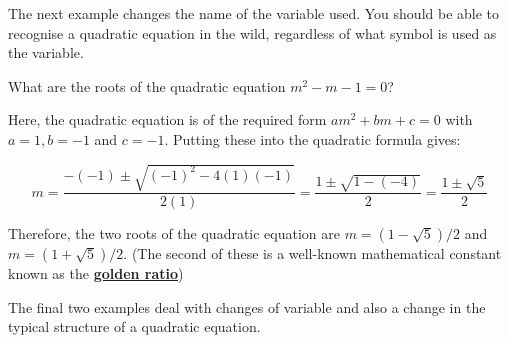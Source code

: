 \documentclass[
  12pt,
  a4paper, oneside]{starmastarticle}
\begin{document}
The next example changes the name of the variable used. You should be
able to recognise a quadratic equation in the wild, regardless of what
symbol is used as the variable.

\begin{tcolorbox}[enhanced jigsaw, toprule=.15mm, opacityback=0, bottomrule=.15mm, arc=.35mm, left=2mm, rightrule=.15mm, breakable, leftrule=.75mm, colframe=quarto-callout-note-color-frame, colback=white]
\begin{minipage}[t]{5.5mm}
\textcolor{quarto-callout-note-color}{\faInfo}
\end{minipage}%
\begin{minipage}[t]{\textwidth - 5.5mm}
What are the roots of the quadratic equation \(m^2 - m - 1 = 0\)?

Here, the quadratic equation is of the required form
\(am^2 + bm + c = 0\) with \(a = 1, b = -1\) and \(c = -1\). Putting
these into the quadratic formula gives:

\[ m = \frac{-(-1) \pm \sqrt{(-1)^2 - 4(1)(-1)}}{2(1)} = \frac{1 \pm \sqrt{1 - (-4)}}{2} = \frac{1 \pm \sqrt{5}}{2}\]

Therefore, the two roots of the quadratic equation are
\(m = (1 -\sqrt{5})/2\) and \(m = (1 + \sqrt{5})/2\). (The second of
these is a well-known mathematical constant known as the
\href{https://en.wikipedia.org/wiki/Golden_ratio}{\textbf{golden
ratio}})\end{minipage}%
\end{tcolorbox}

The final two examples deal with changes of variable and also a change
in the typical structure of a quadratic equation.
\end{document}
